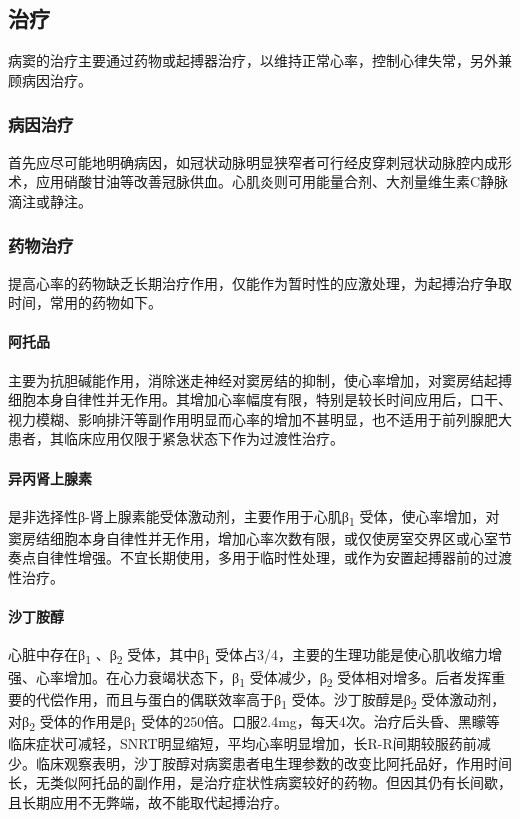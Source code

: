 \subsection{治疗}

病窦的治疗主要通过药物或起搏器治疗，以维持正常心率，控制心律失常，另外兼顾病因治疗。

\subsubsection{病因治疗}

首先应尽可能地明确病因，如冠状动脉明显狭窄者可行经皮穿刺冠状动脉腔内成形术，应用硝酸甘油等改善冠脉供血。心肌炎则可用能量合剂、大剂量维生素C静脉滴注或静注。

\subsubsection{药物治疗}

提高心率的药物缺乏长期治疗作用，仅能作为暂时性的应激处理，为起搏治疗争取时间，常用的药物如下。

\paragraph{阿托品}

主要为抗胆碱能作用，消除迷走神经对窦房结的抑制，使心率增加，对窦房结起搏细胞本身自律性并无作用。其增加心率幅度有限，特别是较长时间应用后，口干、视力模糊、影响排汗等副作用明显而心率的增加不甚明显，也不适用于前列腺肥大患者，其临床应用仅限于紧急状态下作为过渡性治疗。

\paragraph{异丙肾上腺素}

是非选择性β-肾上腺素能受体激动剂，主要作用于心肌β\textsubscript{1}
受体，使心率增加，对窦房结细胞本身自律性并无作用，增加心率次数有限，或仅使房室交界区或心室节奏点自律性增强。不宜长期使用，多用于临时性处理，或作为安置起搏器前的过渡性治疗。

\paragraph{沙丁胺醇}

心脏中存在β\textsubscript{1} 、β\textsubscript{2}
受体，其中β\textsubscript{1}
受体占3/4，主要的生理功能是使心肌收缩力增强、心率增加。在心力衰竭状态下，β\textsubscript{1}
受体减少，β\textsubscript{2}
受体相对增多。后者发挥重要的代偿作用，而且与蛋白的偶联效率高于β\textsubscript{1}
受体。沙丁胺醇是β\textsubscript{2} 受体激动剂，对β\textsubscript{2}
受体的作用是β\textsubscript{1}
受体的250倍。口服2.4mg，每天4次。治疗后头昏、黑矇等临床症状可减轻，SNRT明显缩短，平均心率明显增加，长R-R间期较服药前减少。临床观察表明，沙丁胺醇对病窦患者电生理参数的改变比阿托品好，作用时间长，无类似阿托品的副作用，是治疗症状性病窦较好的药物。但因其仍有长间歇，且长期应用不无弊端，故不能取代起搏治疗。

